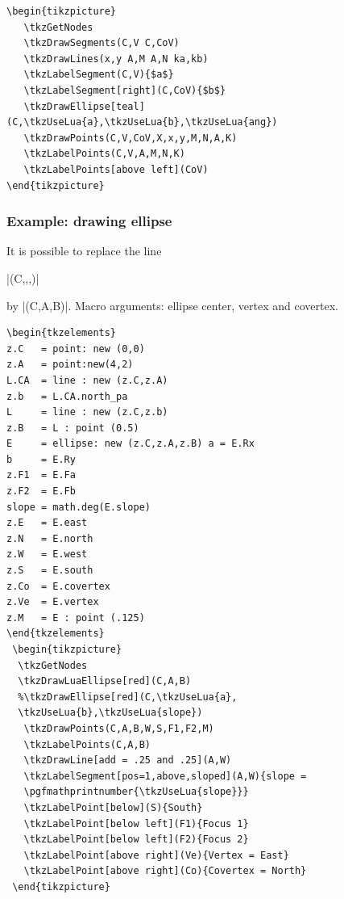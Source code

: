 \begin{Verbatim}
\begin{tikzpicture}
   \tkzGetNodes
   \tkzDrawSegments(C,V C,CoV)
   \tkzDrawLines(x,y A,M A,N ka,kb)
   \tkzLabelSegment(C,V){$a$}
   \tkzLabelSegment[right](C,CoV){$b$}
   \tkzDrawEllipse[teal](C,\tkzUseLua{a},\tkzUseLua{b},\tkzUseLua{ang})
   \tkzDrawPoints(C,V,CoV,X,x,y,M,N,A,K)
   \tkzLabelPoints(C,V,A,M,N,K)
   \tkzLabelPoints[above left](CoV)
\end{tikzpicture}
\end{Verbatim}

\subsubsection{Example: drawing ellipse} %
\label{ssub:example_drawing_ellipse}

 It is possible to replace the line
 
 |\tkzDrawEllipse[teal](C,,,)|

 by |\tkzDrawLuaEllipse[teal](C,A,B)|. Macro arguments: ellipse center, vertex and covertex.

\vspace{6pt}
\begin{Verbatim}
\begin{tkzelements}
z.C   = point: new (0,0)
z.A   = point:new(4,2)
L.CA  = line : new (z.C,z.A)
z.b   = L.CA.north_pa
L     = line : new (z.C,z.b)
z.B   = L : point (0.5)
E     = ellipse: new (z.C,z.A,z.B) a = E.Rx
b     = E.Ry
z.F1  = E.Fa
z.F2  = E.Fb
slope = math.deg(E.slope)
z.E   = E.east
z.N   = E.north
z.W   = E.west
z.S   = E.south
z.Co  = E.covertex
z.Ve  = E.vertex
z.M   = E : point (.125)
\end{tkzelements}
 \begin{tikzpicture}
  \tkzGetNodes
  \tkzDrawLuaEllipse[red](C,A,B)    
  %\tkzDrawEllipse[red](C,\tkzUseLua{a},
  \tkzUseLua{b},\tkzUseLua{slope})
   \tkzDrawPoints(C,A,B,W,S,F1,F2,M)
   \tkzLabelPoints(C,A,B)
   \tkzDrawLine[add = .25 and .25](A,W)
   \tkzLabelSegment[pos=1,above,sloped](A,W){slope =  
   \pgfmathprintnumber{\tkzUseLua{slope}}}
   \tkzLabelPoint[below](S){South}
   \tkzLabelPoint[below left](F1){Focus 1}
   \tkzLabelPoint[below left](F2){Focus 2}
   \tkzLabelPoint[above right](Ve){Vertex = East}
   \tkzLabelPoint[above right](Co){Covertex = North}
 \end{tikzpicture}
\end{Verbatim}

